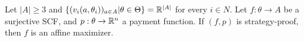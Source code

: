 \begin{thm}
  \label{sec:mech-with-paym-11}
  Let $|A| \geq 3$  and $\{ (v_{i}(a, \theta_{i}))_{a \in A} | \theta
  \in \Theta \} = \mathbb{R}^{|A|}$ for every $i \in N$. Let $f: \theta
  \rightarrow A$ be a surjective SCF, and $p: \theta \rightarrow
  \mathbb{R}^{n}$ a payment function.  If $(f, p)$ is strategy-proof, then $f$
  is an affine maximizer.
\end{thm}




